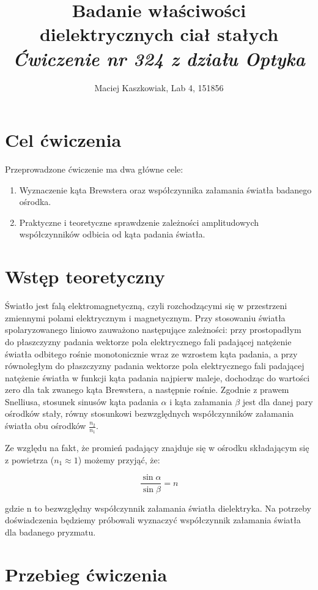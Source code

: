 \documentclass[polish, a4paper]{article}
\title{Badanie właściwości dielektrycznych ciał stałych\\
        \Large \emph{Ćwiczenie nr 324 z działu Optyka}}
\author{Maciej Kaszkowiak, Lab 4, 151856}
\date{\vspace{-5ex}} %
\begin{document}
\maketitle

\section{Cel ćwiczenia}
Przeprowadzone ćwiczenie ma dwa główne cele:
\begin{enumerate}
\item{Wyznaczenie kąta Brewstera oraz współczynnika załamania światła badanego ośrodka. }
\item{Praktyczne i teoretyczne sprawdzenie zależności amplitudowych współczynników odbicia od kąta padania światła.}
\end{enumerate}
\section{Wstęp teoretyczny}

Światło jest falą elektromagnetyczną, czyli rozchodzącymi się w przestrzeni zmiennymi polami elektrycznym i magnetycznym. Przy stosowaniu światła spolaryzowanego liniowo zauważono następujące zależności: przy prostopadłym do płaszczyzny padania wektorze pola elektrycznego fali padającej natężenie światła odbitego rośnie monotonicznie wraz ze wzrostem kąta padania, a przy równoległym do płaszczyzny padania wektorze pola elektrycznego fali padającej natężenie światła w funkcji kąta padania najpierw maleje, dochodząc do wartości zero dla tak zwanego kąta Brewstera, a następnie rośnie. Zgodnie z prawem Snelliusa, stosunek sinusów kąta padania $\alpha$ i kąta załamania $\beta$ jest dla danej pary ośrodków stały, równy stosunkowi bezwzględnych współczynników załamania światła obu ośrodków $\frac{n_2}{n_1}$.

Ze względu na fakt, że promień padający znajduje się w ośrodku składającym się z powietrza ($n_1 \approx 1$) możemy przyjąć, że:

\begin{equation}
\frac{\sin \alpha}{\sin \beta} = n
\end{equation}

gdzie n to bezwzględny współczynnik załamania światła dielektryka. Na potrzeby doświadczenia będziemy próbowali wyznaczyć współczynnik załamania światła dla badanego pryzmatu.

\section{Przebieg ćwiczenia}
\end{document}

